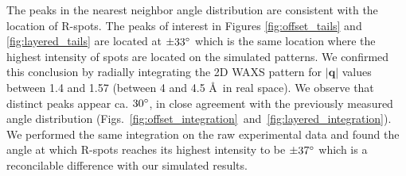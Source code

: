 \documentclass{article}
\begin{document}
  The peaks in the nearest neighbor angle distribution are consistent with the
  location of R-spots. The peaks of interest in Figures \ref{fig:offset_tails}
  and \ref{fig:layered_tails} are located at $\pm 33 \degree$ which is the same
  location where the highest intensity of spots are located on the simulated
  patterns. We confirmed this conclusion by radially integrating the 2D WAXS
  pattern for $\left|\mathbf{q}\right|$ values between 1.4 and 1.57 (between 4
  and 4.5 \AA~in real space). We observe that distinct peaks appear ca. $30
  \degree$, in close agreement with the previously measured angle distribution
  (Figs.~\ref{fig:offset_integration}~and~\ref{fig:layered_integration}). We
  performed the same integration on the raw experimental data and found the angle
  at which R-spots reaches its highest intensity to be $\pm 37 \degree$ which
  is a reconcilable difference with our simulated results.

\end{document}
